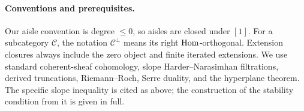 \paragraph{Conventions and prerequisites.}
Our aisle convention is degree $\le0$, so aisles are closed under $[1]$.
For a subcategory $\mathcal C$, the notation
$\mathcal C^\perp$ means its right $\operatorname{Hom}$-orthogonal. Extension closures always
include the zero object and finite iterated extensions. We use standard
coherent-sheaf cohomology, slope Harder--Narasimhan filtrations, derived
truncations, Riemann--Roch, Serre duality, and the hyperplane theorem. The
specific slope inequality is cited as above; the construction of the
stability condition from it is given in full.
